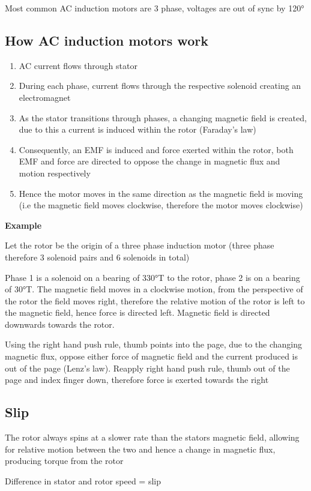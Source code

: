 	Most common AC induction motors are 3 phase, voltages are out of sync by 120°

	\subsection{How AC induction motors work}

		\begin{enumerate}
			\item AC current flows through stator
			\item During each phase, current flows through the respective solenoid creating an electromagnet
			\item As the stator transitions through phases, a changing magnetic field is created, due to this a current is induced within the rotor (Faraday's law)
			\item Consequently, an EMF is induced and force exerted within the rotor, both EMF and force are directed to oppose the change in magnetic flux and motion respectively
			\item Hence the motor moves in the same direction as the magnetic field is moving (i.e the magnetic field moves clockwise, therefore the motor moves clockwise)
		\end{enumerate}

		\textbf{Example}

			Let the rotor be the origin of a three phase induction motor (three phase therefore 3 solenoid pairs and 6 solenoids in total)

			Phase 1 is a solenoid on a bearing of 330°T to the rotor, phase 2 is on a bearing of 30°T. The magnetic field moves in a clockwise motion, from the perspective of the rotor the field moves right, therefore the relative motion of the rotor is left to the magnetic field, hence force is directed left. Magnetic field is directed downwards towards the rotor.

			Using the right hand push rule, thumb points into the page, due to the changing magnetic flux, oppose either force of magnetic field and the current produced is out of the page (Lenz’s law). Reapply right hand push rule, thumb out of the page and index finger down, therefore force is exerted towards the right

	\subsection{Slip}
	
		The rotor always spins at a slower rate than the stators magnetic field, allowing for relative motion between the two and hence a change in magnetic flux, producing torque from the rotor
			
		Difference in stator and rotor speed = slip
	

